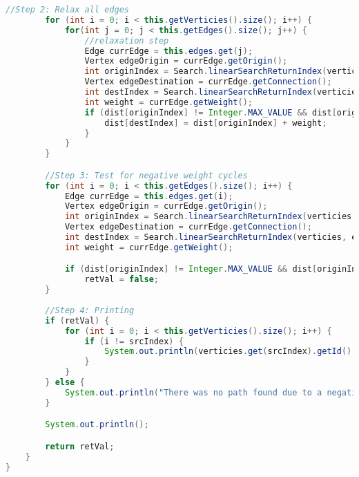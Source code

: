 \documentclass[letterpaper, 10pt,DIV=13]{scrartcl}
\numberwithin{equation}{section} %
\numberwithin{figure}{section} %
\numberwithin{table}{section} %
\begin{document}
\begin{lstlisting}[frame=single, language=java, breaklines]
        //Step 2: Relax all edges
        for (int i = 0; i < this.getVerticies().size(); i++) {
            for(int j = 0; j < this.getEdges().size(); j++) {
                //relaxation step
                Edge currEdge = this.edges.get(j);
                Vertex edgeOrigin = currEdge.getOrigin();
                int originIndex = Search.linearSearchReturnIndex(verticies, edgeOrigin.getId());
                Vertex edgeDestination = currEdge.getConnection();
                int destIndex = Search.linearSearchReturnIndex(verticies, edgeDestination.getId());
                int weight = currEdge.getWeight();
                if (dist[originIndex] != Integer.MAX_VALUE && dist[originIndex] + weight < dist[destIndex]) {
                    dist[destIndex] = dist[originIndex] + weight;
                }
            }
        }

        //Step 3: Test for negative weight cycles
        for (int i = 0; i < this.getEdges().size(); i++) {
            Edge currEdge = this.edges.get(i);
            Vertex edgeOrigin = currEdge.getOrigin();
            int originIndex = Search.linearSearchReturnIndex(verticies, edgeOrigin.getId());
            Vertex edgeDestination = currEdge.getConnection();
            int destIndex = Search.linearSearchReturnIndex(verticies, edgeDestination.getId());
            int weight = currEdge.getWeight();

            if (dist[originIndex] != Integer.MAX_VALUE && dist[originIndex] + weight < dist[destIndex])
                retVal = false;
        }
        
        //Step 4: Printing
        if (retVal) {
            for (int i = 0; i < this.getVerticies().size(); i++) {
                if (i != srcIndex) {
                    System.out.println(verticies.get(srcIndex).getId() + " -> " + verticies.get(i).getId() + " cost is " + dist[i] + "; ");
                }
            }
        } else {
            System.out.println("There was no path found due to a negative loop.");
        }

        System.out.println();

        return retVal;
    }
}
\end{lstlisting}
\end{document}
